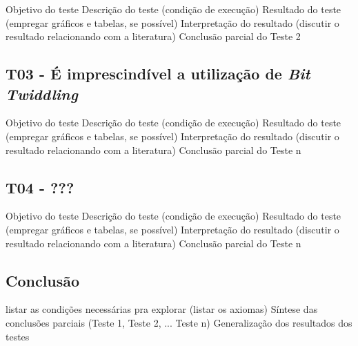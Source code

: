 \documentclass[
	article,			    %
	12pt,				    %
	oneside,			    %
	a4paper,			    %
	chapter=TITLE,		    %
	section=TITLE,		    %
	subsection=TITLE,	    %
	english,			    %
	brazil,				    %
	sumario=tradicional
]{abntex2}
\begin{document}
Objetivo do teste
Descrição do teste (condição de execução)
Resultado do teste (empregar gráficos e tabelas, se possível)
Interpretação do resultado (discutir o resultado relacionando com a literatura)
Conclusão parcial do Teste 2

\subsection{T03 - É imprescindível a utilização de \emph{Bit Twiddling}}
Objetivo do teste
Descrição do teste (condição de execução)
Resultado do teste (empregar gráficos e tabelas, se possível)
Interpretação do resultado (discutir o resultado relacionando com a literatura)
Conclusão parcial do Teste n

\subsection{T04 - ???}
Objetivo do teste
Descrição do teste (condição de execução)
Resultado do teste (empregar gráficos e tabelas, se possível)
Interpretação do resultado (discutir o resultado relacionando com a literatura)
Conclusão parcial do Teste n

\subsection{Conclusão}

listar as condições necessárias pra explorar (listar os axiomas)
Síntese das conclusões parciais (Teste 1, Teste 2, ... Teste n)
Generalização dos resultados dos testes
\end{document}
